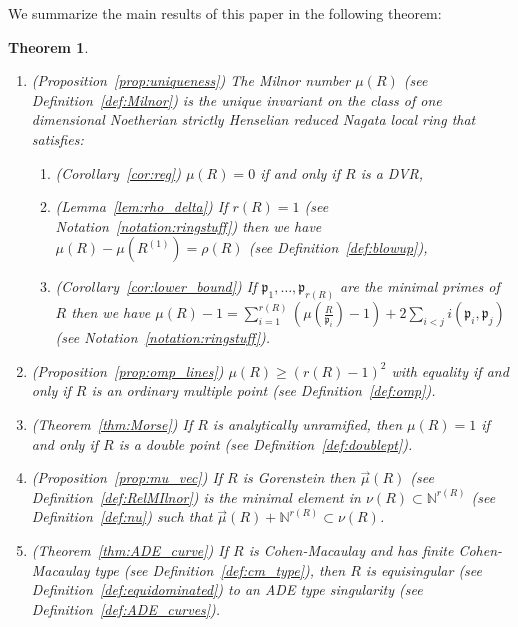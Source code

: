\documentclass{article}
\newtheorem*{theorem*}{Theorem}
\numberwithin{theorem}{section}
\begin{document}
We summarize the main results of this paper in the following theorem:

\begin{theorem*}
    \begin{enumerate}
        \item (Proposition~\ref{prop:uniqueness}) The Milnor number $\mu(R)$ (see Definition~\ref{def:Milnor}) is the unique invariant on the class of one dimensional Noetherian strictly Henselian reduced Nagata local ring that satisfies:
        \begin{enumerate}
        \item (Corollary~\ref{cor:reg}) $\mu(R)=0$ if and only if $R$ is a DVR, 
        \item (Lemma~\ref{lem:rho_delta}) If $r(R)=1$ (see Notation~\ref{notation:ringstuff}) then  we have $\mu(R)-\mu(R^{(1)})  = \rho(R)$ (see Definition~\ref{def:blowup}), 
        \item (Corollary~\ref{cor:lower_bound}) If $\mathfrak{p}_1, \dots, \mathfrak{p}_{r(R)}$ are the minimal primes of $R$ then we have $\mu(R) -1 = \sum_{i=1}^{r(R)} \left(\mu\left(\frac{R}{\mathfrak{p}_i}\right)-1\right) + 2\sum_{i <  j} i(\mathfrak{p}_i, \mathfrak{p}_j)$ (see Notation~\ref{notation:ringstuff}).
    \end{enumerate}
    \item (Proposition~\ref{prop:omp_lines}) $\mu(R) \geq (r(R)-1)^2$ with equality if and only if $R$ is an ordinary multiple point (see Definition~\ref{def:omp}). 
    \item (Theorem~\ref{thm:Morse}) If $R$ is analytically unramified, then  $\mu(R)=1$ if and only if $R$ is a double point (see Definition~\ref{def:doublept}). 
    \item (Proposition~\ref{prop:mu_vec}) If $R$ is Gorenstein then $\vec{\mu}(R)$ (see Definition~\ref{def:RelMIlnor}) is the minimal element in $\nu(R) \subset \mathbb{N}^{r(R)}$ (see Definition~\ref{def:nu}) such that $\vec{\mu}(R) + \mathbb{N}^{r(R)} \subset \nu(R)$.
    \item (Theorem~\ref{thm:ADE_curve}) If $R$ is Cohen-Macaulay and has finite Cohen-Macaulay type (see Definition~\ref{def:cm_type}), then $R$ is equisingular (see Definition~\ref{def:equidominated}) to an ADE type singularity (see Definition~\ref{def:ADE_curves}). 
    \end{enumerate}
\end{theorem*}
\end{document}
